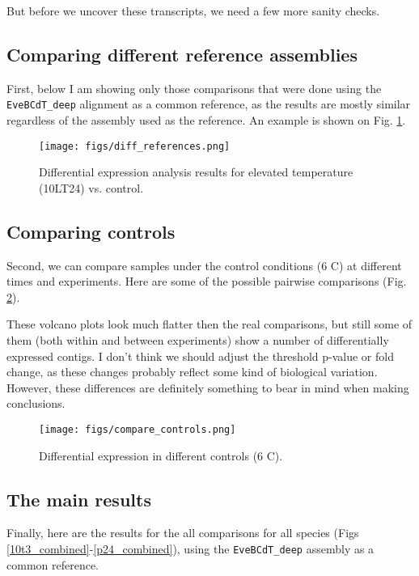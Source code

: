 \documentclass[12pt]{article}
\begin{document}
But before we uncover these transcripts, we need a few more sanity checks. 

\subsection{Comparing different reference assemblies}

First, below I am showing only those comparisons that were done using the \texttt{EveBCdT\_deep} alignment as a common reference, as the results are mostly similar regardless of the assembly used as the reference. An example is shown on Fig. \ref{diff_references}. 

\begin{figure}[H]
\noindent \texttt{[image: figs/diff\_references.png]}
\caption{Differential expression analysis results for elevated temperature (10LT24) vs. control.}
\label{diff_references}
\end{figure}


\subsection{Comparing controls}
Second, we can compare samples under the control conditions (6 \textdegree C) at different times and experiments. Here are some of the possible pairwise comparisons (Fig. \ref{compare_controls}). 

These volcano plots look much flatter then the real comparisons, but still some of them (both within and between experiments) show a number of differentially expressed contigs. I don't think we should adjust the threshold p-value or fold change, as these changes probably reflect some kind of biological variation. However, these differences are definitely something to bear in mind when making conclusions. 

\begin{figure}[H]
\noindent \texttt{[image: figs/compare\_controls.png]}
\caption{Differential expression in different controls (6 \textdegree C).}
\label{compare_controls}
\end{figure}

\bigskip

\subsection{The main results}

Finally, here are the results for the all comparisons for all species (Figs \ref{10t3_combined}-\ref{p24_combined}), using the \texttt{EveBCdT\_deep}  assembly as a common reference. 
\end{document}
